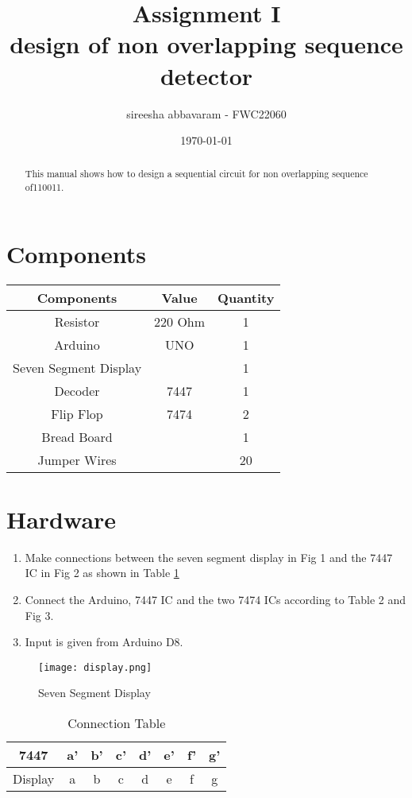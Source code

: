 \documentclass[journal,12pt,twocolumn]{IEEEtran}
\title{Assignment \textrm{I}
\textbf{\\design of non overlapping sequence detector}}
\author{sireesha abbavaram - FWC22060}
\date{\today}
\begin{document}
\maketitle

\tableofcontents 
\vspace{0.5cm}

\begin{abstract}
This manual shows how to design a sequential circuit for non overlapping sequence of110011.
\end{abstract}

\section{Components}
\begin{tabular}{|c|c|c|}
\hline
Components & Value & Quantity\\
\hline
Resistor & 220 Ohm & 1\\
\hline
Arduino & UNO & 1\\
\hline
Seven Segment Display & & 1\\
\hline
Decoder & 7447 & 1\\
\hline
Flip Flop & 7474 & 2\\
\hline
Bread Board & & 1\\
\hline
Jumper Wires & & 20\\
\hline
\end{tabular}

\section{Hardware}
\begin{enumerate}
\item Make connections between the seven segment display in Fig 1 and the 7447 IC in Fig 2 as shown in Table \ref{table:1}
\item Connect the Arduino, 7447 IC and the two 7474 ICs according to Table 2 and Fig 3.
\item Input is given from Arduino D8.
\vspace{0.5cm}
\end{enumerate} 

\begin{figure}[h!]
\centering
\texttt{[image: display.png]}
\centering
\caption{Seven Segment Display}
\end{figure}


\begin{table}[h]
\Large
\centering
\begin{tabular}{|c|c|c|c|c|c|c|c|}
\hline
7447 & a' & b' & c' & d' & e' & f' & g'\\
\hline
Display & a & b & c & d & e & f & g\\
\hline
\end{tabular}
\caption{Connection Table}
\label{table:1}
\end{table}
\end{document}
